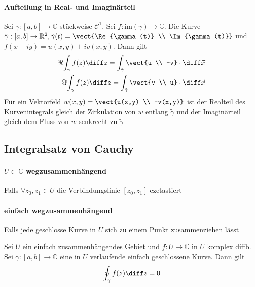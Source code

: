 \begin{sectionbox}
    \paragraph{Aufteilung in Real- und Imaginärteil} Sei $\gamma:[a,b]\rightarrow\mathbb C$ stückweise $\mathcal C^1$.
    Sei $f:\text{im}(\gamma)\rightarrow\mathbb C$. Die Kurve $\tilde\gamma:[a,b]\rightarrow\mathbb R^2, \tilde\gamma(t) = \vect{\Re{\gamma(t)} \\ \Im{\gamma(t)}}$ und $f(x+iy) = u(x,y) + iv(x,y)$.
    Dann gilt \begin{align*}
        \Re{\int_\gamma f(z)\diff z} = \int_{\tilde\gamma}\vect{u \\ -v}\cdot \diff\vec x \\
        \Im{\int_\gamma f(z)\diff z} = \int_{\tilde\gamma}\vect{v \\ u}\cdot \diff\vec x
    \end{align*}
    Für ein Vektorfeld $w(x,y) = \vect{u(x,y) \\ -v(x,y)}$ ist der Realteil des Kurvenintegrals gleich der Zirkulation von $w$ entlang $\tilde\gamma$ und der Imaginärteil gleich dem Fluss von $w$ senkrecht zu $\tilde\gamma$
\end{sectionbox}

\subsection{Integralsatz von Cauchy}
\paragraph{$U\subset\mathbb C$ wegzusammenhängend} Falls $\forall z_0,z_1\in U$ die Verbindungslinie $[z_0,z_1]$ ezetastiert
\paragraph{einfach wegzusammenhängend} Falls jede geschlosse Kurve in $U$ sich zu einem Punkt zusammenziehen lässt

\begin{emphbox}
    Sei $U$ ein einfach zusammenhängendes Gebiet und $f:U\rightarrow\mathbb C$ in $U$ komplex diffb.
    Sei $\gamma:[a,b]\rightarrow\mathbb C$ eine in $U$ verlaufende einfach geschlossene Kurve.
    Dann gilt \begin{equation*}
        \oint_\gamma f(z)\diff z = 0
    \end{equation*}
\end{emphbox}

